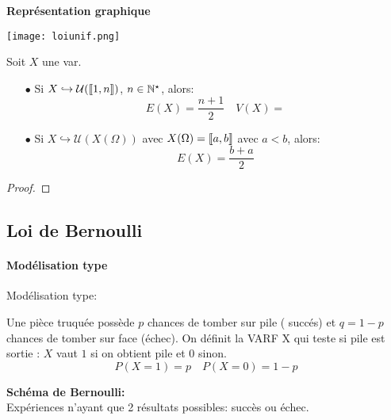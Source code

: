 \documentclass[a4paper, 11pt]{article}
\begin{document}
\textbf{Repr\'esentation graphique }
\begin{center}
\texttt{[image: loiunif.png]}
\end{center}

 










\begin{prop} Soit $X$ une var.
\begin{itemize}
\item[$\bullet$] Si $X\hookrightarrow \mathcal{U}(\llbracket 1,n\rrbracket)$, $n\in\mathbb{N}^{\star}$, alors:
$$E(X) = \frac{n+1}{2} \quad V(X) = $$

\item[$\bullet$] Si $X\hookrightarrow \mathcal{U}(X(\Omega))$ avec $X(\Omega)=\llbracket  a,b\rrbracket$ avec $a<b$, alors:
$$E(X) =\frac{b+a}{2} $$ 

\end{itemize}
\end{prop}
 

\begin{proof}


\end{proof}

 

\subsection{Loi de Bernoulli}



\paragraph{Mod\'elisation type}

 Mod\'elisation type: 
 
Une pièce truquée possède $p$ chances de tomber sur pile ( succés) et $q=1-p$ chances de tomber sur face (échec). On définit la VARF X qui teste si pile est sortie : $X$ vaut $1$ si on obtient pile et $0$ sinon. 
$$P(X=1) =p \quad P(X=0) = 1-p$$


\begin{dboxminipage}{0.7 \textwidth}
\textbf{\large{Sch\'ema de Bernoulli:}}\\
 Exp\'eriences n'ayant que 2 r\'esultats possibles: succ\`{e}s ou \'echec.
\end{dboxminipage}
\end{document}
